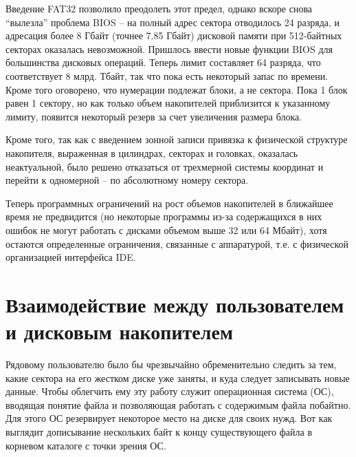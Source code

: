 \documentclass[bachelor, och, referat]{SCWorks}
\begin{document}
Введение FAT32 позволило преодолеть этот предел, однако вскоре снова ``вылезла''
проблема BIOS -- на полный адрес сектора отводилось 24 разряда, и адресация 
более 8 Гбайт (точнее 7.85 Гбайт) дисковой памяти при 512-байтных секторах 
оказалась невозможной. Пришлось ввести новые функции BIOS для большинства 
дисковых операций. Теперь лимит составляет 64 разряда, что соответствует 
8 млрд. Тбайт, так что пока есть некоторый запас по времени. Кроме того 
оговорено, что нумерации подлежат блоки, а не сектора. Пока 1 блок равен 1 
сектору, но как только объем накопителей приблизится к указанному лимиту, 
появится некоторый резерв за счет увеличения размера блока.

Кроме того, так как с введением зонной записи привязка к физической структуре 
накопителя, выраженная в цилиндрах, секторах и головках, оказалась неактуальной, 
было решено отказаться от трехмерной системы координат и перейти к одномерной --
по абсолютному номеру сектора.

Теперь программных ограничений на рост объемов накопителей в ближайшее время не 
предвидится (но некоторые программы из-за содержащихся в них ошибок не могут 
работать с дисками объемом выше 32 или 64 Мбайт), хотя остаются определенные 
ограничения, связанные с аппаратурой, т.е. с физической организацией 
интерфейса IDE.


\section{Взаимодействие между пользователем и дисковым накопителем}

Рядовому пользователю было бы чрезвычайно обременительно следить за тем, какие сектора на его жестком диске уже заняты, и куда следует записывать новые данные. Чтобы облегчить ему эту работу служит операционная система (ОС), вводящая понятие файла и позволяющая работать с содержимым файла побайтно. Для этого ОС резервирует некоторое место на диске для своих нужд. Вот как выглядит дописывание нескольких байт к концу существующего файла в корневом каталоге с точки зрения ОС.
\end{document}
